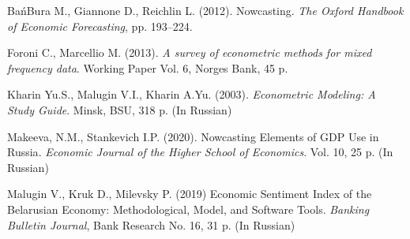 \documentclass[12pt]{article}
\begin{document}

\begin{thebibliography}{10}

BańBura M., Giannone D., Reichlin L. (2012). {Nowcasting}. \textit{The Oxford Handbook of Economic Forecasting}, pp. 193–224.

Foroni C., Marcellio M. (2013). \textit{A survey of econometric methods for mixed frequency data}. {Working Paper} Vol. 6, Norges Bank, 45 p.

Kharin Yu.S., Malugin V.I., Kharin A.Yu. (2003). \textit{Econometric Modeling: A Study Guide}. Minsk, BSU, 318 p. (In Russian)


Makeeva, N.M., Stankevich I.P. (2020). {Nowcasting Elements of GDP Use in Russia}. \textit{Economic Journal of the Higher School of Economics}. Vol. 10, 25 p. (In Russian)


Malugin V., Kruk D., Milevsky P. (2019) Economic Sentiment Index of the Belarusian Economy: Methodological, Model, and Software Tools. \textit{Banking Bulletin Journal}, Bank Research No. 16, 31 p. (In Russian)

\end{thebibliography}
\end{document}
